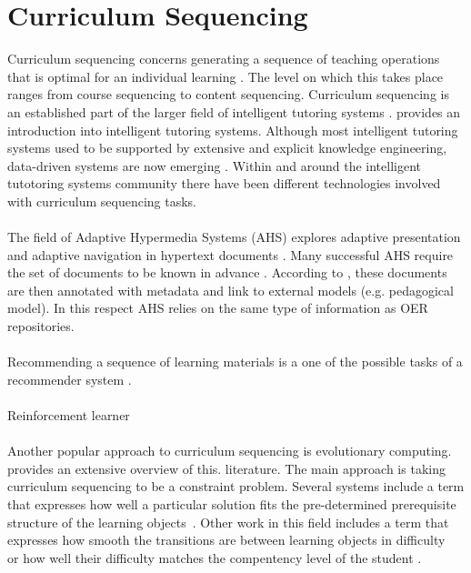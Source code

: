 \section{Curriculum Sequencing}
\label{sec:background_curriculum_sequencing}
Curriculum sequencing concerns generating a sequence of teaching operations
that is optimal for an individual learning \citep{Brusilovsky2003a}. The level
on which this takes place ranges from course sequencing to content sequencing.
Curriculum sequencing is an established part of the larger field of intelligent
tutoring systems \citep{Brusilovsky1996}. \citet{Vanlehn2006} provides an
introduction into intelligent tutoring systems. Although most intelligent
tutoring systems used to be supported by extensive and explicit knowledge
engineering, data-driven systems are now emerging \citep{Koedinger2013}. Within
and around the intelligent tutotoring systems community there have been
different technologies involved with curriculum sequencing tasks.\\\\
\noindent
The field of Adaptive Hypermedia Systems (AHS) explores adaptive presentation and
adaptive navigation in hypertext documents \citep{Brusilovsky2003b}. Many
successful AHS require the set of documents to be known in advance
\citep{Brusilovsky2007}. According to \citeauthor{Brusilovsky2007}, these
documents are then annotated with metadata and link to external models (e.g.
pedagogical model). In this respect AHS relies on the same type of information
as OER repositories.\\\\
\noindent
Recommending a sequence of learning materials is a one of the possible tasks of
a recommender system \citep{Manouselis2011}.
\\\\
\noindent
Reinforcement learner\\\\


\noindent
Another popular approach to curriculum sequencing is evolutionary computing.
\citet{AlMuhaideb2011} provides an extensive overview of this. literature.
The main approach is taking curriculum sequencing to be a constraint
problem. Several systems include a term that expresses how
well a particular solution fits the pre-determined prerequisite structure of
the learning objects~\citep{Seki2005, Chen2009, Samia2007}.
Other work in this field includes a term that expresses how smooth the
transitions are between learning objects in difficulty~\citep{Hovakimyan2004,
Seki2005, Chen2008, Huang2007} or how well their difficulty matches the
compentency level of the student \citep{Seki2005, Chen2008, Chen2009, Samia2007, Huang2007}.


